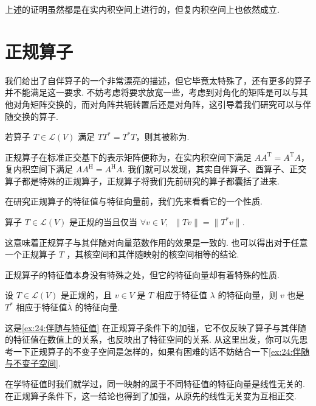 上述的证明虽然都是在实内积空间上进行的，但复内积空间上也依然成立.

\section{正规算子}

我们给出了自伴算子的一个非常漂亮的描述，但它毕竟太特殊了，还有更多的算子并不能满足这一要求. 不妨考虑将要求放宽一些，考虑到对角化的矩阵是可以与其他对角矩阵交换的，而对角阵共轭转置后还是对角阵，这引导着我们研究可以与伴随交换的算子.

\begin{definition}[正规算子] 
    若算子 $ T \in \mathcal{L}(V) $ 满足 $ TT^* = T^*T $，则其被称为.
\end{definition}

正规算子在标准正交基下的表示矩阵便称为，在实内积空间下满足 $ AA^{\mathrm{T}} = A^{\mathrm{T}}A $，复内积空间下满足 $ AA^{\mathrm{H}} = A^{\mathrm{H}}A $. 我们就可以发现，其实自伴算子、酉算子、正交算子都是特殊的正规算子，正规算子将我们先前研究的算子都囊括了进来.

在研究正规算子的特征值与特征向量前，我们先来看看它的一个性质.

\begin{theorem} \label{thm:24:正规算子的等价条件}
    算子 $ T \in \mathcal{L}(V) $ 是正规的当且仅当 $ \forall v \in V,\enspace \lVert Tv \rVert = \lVert T^*v \rVert $.
\end{theorem}

这意味着正规算子与其伴随对向量范数作用的效果是一致的. 也可以得出对于任意一个正规算子 $ T $ ，其核空间和其伴随映射的核空间相等的结论.

正规算子的特征值本身没有特殊之处，但它的特征向量却有着特殊的性质.

\begin{theorem} \label{thm:24:正规算子的特征向量}
    设 $ T \in \mathcal{L}(V) $ 是正规的，且 $ v \in V $ 是 $ T $ 相应于特征值 $ \lambda $ 的特征向量，则 $ v $ 也是 $ T^* $ 相应于特征值$ \overline{\lambda} $ 的特征向量.
\end{theorem}

这是\autoref{ex:24:伴随与特征值} 在正规算子条件下的加强，它不仅反映了算子与其伴随的特征值在数值上的关系，也反映出了特征空间的关系. 从这里出发，你可以先思考一下正规算子的不变子空间是怎样的，如果有困难的话不妨结合一下\autoref{ex:24:伴随与不变子空间}.

在学特征值时我们就学过，同一映射的属于不同特征值的特征向量是线性无关的. 在正规算子条件下，这一结论也得到了加强，从原先的线性无关变为互相正交.

